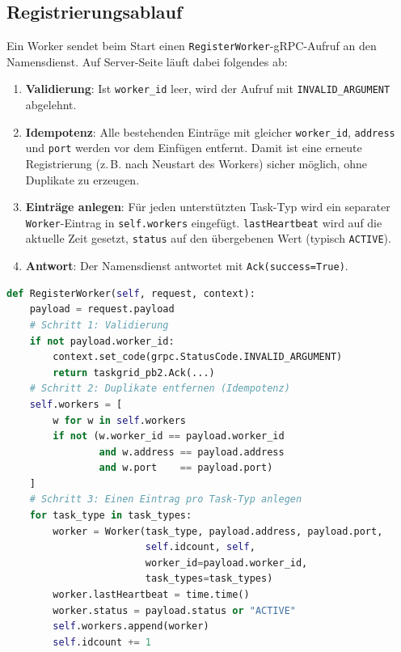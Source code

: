 \subsection{Registrierungsablauf}
\label{sec:nd-registrierung-ablauf}

Ein Worker sendet beim Start einen \texttt{RegisterWorker}-gRPC-Aufruf
an den Namensdienst.
Auf Server-Seite läuft dabei folgendes ab:

\begin{enumerate}
  \item \textbf{Validierung}: Ist \texttt{worker\_id} leer, wird der Aufruf
        mit \texttt{INVALID\_ARGUMENT} abgelehnt.
  \item \textbf{Idempotenz}: Alle bestehenden Einträge mit gleicher
        \texttt{worker\_id}, \texttt{address} und \texttt{port} werden
        vor dem Einfügen entfernt.
        Damit ist eine erneute Registrierung (z.\,B. nach Neustart des Workers)
        sicher möglich, ohne Duplikate zu erzeugen.
  \item \textbf{Einträge anlegen}: Für jeden unterstützten Task-Typ wird
        ein separater \texttt{Worker}-Eintrag in \texttt{self.workers}
        eingefügt.
        \texttt{lastHeartbeat} wird auf die aktuelle Zeit gesetzt,
        \texttt{status} auf den übergebenen Wert (typisch \texttt{ACTIVE}).
  \item \textbf{Antwort}: Der Namensdienst antwortet mit
        \texttt{Ack(success=True)}.
\end{enumerate}

\begin{lstlisting}[language=Python,caption={Registrierungslogik -- Namensdienst-seitig (nameservice.py)}]
def RegisterWorker(self, request, context):
    payload = request.payload
    # Schritt 1: Validierung
    if not payload.worker_id:
        context.set_code(grpc.StatusCode.INVALID_ARGUMENT)
        return taskgrid_pb2.Ack(...)
    # Schritt 2: Duplikate entfernen (Idempotenz)
    self.workers = [
        w for w in self.workers
        if not (w.worker_id == payload.worker_id
                and w.address == payload.address
                and w.port    == payload.port)
    ]
    # Schritt 3: Einen Eintrag pro Task-Typ anlegen
    for task_type in task_types:
        worker = Worker(task_type, payload.address, payload.port,
                        self.idcount, self,
                        worker_id=payload.worker_id,
                        task_types=task_types)
        worker.lastHeartbeat = time.time()
        worker.status = payload.status or "ACTIVE"
        self.workers.append(worker)
        self.idcount += 1
\end{lstlisting}

